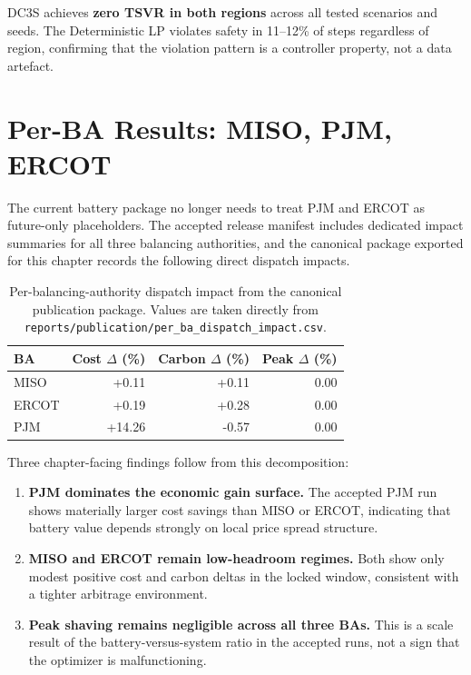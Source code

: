 DC3S achieves \textbf{zero TSVR in both regions} across all tested
scenarios and seeds.  The Deterministic LP violates safety in 11--12\%
of steps regardless of region, confirming that the violation pattern is
a controller property, not a data artefact.

\section{Per-BA Results: MISO, PJM, ERCOT}

The current battery package no longer needs to treat PJM and ERCOT as
future-only placeholders.  The accepted release manifest includes
dedicated impact summaries for all three balancing authorities, and the
canonical package exported for this chapter records the following direct
dispatch impacts.

\begin{table}[ht]
\centering
\caption{Per-balancing-authority dispatch impact from the canonical
  publication package.  Values are taken directly from
  \texttt{reports/publication/per\_ba\_dispatch\_impact.csv}.}
\label{tab:per-ba-impact}
\begin{tabular}{lrrr}
\toprule
\textbf{BA} & \textbf{Cost $\Delta$ (\%)} & \textbf{Carbon $\Delta$ (\%)} &
  \textbf{Peak $\Delta$ (\%)} \\
\midrule
MISO  & +0.11 & +0.11 & 0.00 \\
ERCOT & +0.19 & +0.28 & 0.00 \\
PJM   & +14.26 & -0.57 & 0.00 \\
\bottomrule
\end{tabular}
\end{table}

Three chapter-facing findings follow from this decomposition:
\begin{enumerate}
  \item \textbf{PJM dominates the economic gain surface.}  The accepted PJM
    run shows materially larger cost savings than MISO or ERCOT, indicating
    that battery value depends strongly on local price spread structure.
  \item \textbf{MISO and ERCOT remain low-headroom regimes.}  Both show only
    modest positive cost and carbon deltas in the locked window, consistent
    with a tighter arbitrage environment.
  \item \textbf{Peak shaving remains negligible across all three BAs.}  This
    is a scale result of the battery-versus-system ratio in the accepted runs,
    not a sign that the optimizer is malfunctioning.
\end{enumerate}

